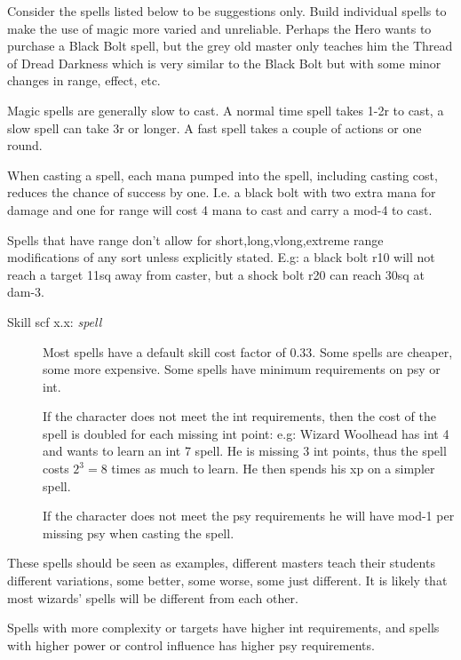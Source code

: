 Consider the spells listed below to be suggestions only. Build individual spells to make the use of magic more varied and unreliable. Perhaps the Hero wants to purchase a Black Bolt spell, but the grey old master only teaches him the Thread of Dread Darkness which is very similar to the Black Bolt but with some minor changes in range, effect, etc.

Magic spells are generally slow to cast. A normal time spell takes 1-2r to cast, a slow spell can take 3r or longer. A fast spell takes a couple of actions or one round.

When casting a spell, each mana pumped into the spell, including casting cost, reduces the chance of success by one. I.e. a black bolt with two extra mana for damage and one for range will cost 4 mana to cast and carry a mod-4 to cast.

Spells that have range don't allow for short,long,vlong,extreme range modifications of any sort unless explicitly stated. E.g: a black bolt r10 will not reach a target 11sq away from caster, but a shock bolt r20 can reach 30sq at dam-3.


\begin{description}

\item[Skill scf x.x: \emph{spell}] Most spells have a default skill cost factor of 0.33. Some spells are cheaper, some more expensive. Some spells have minimum requirements on psy or int. 

If the character does not meet the int requirements, then the cost of the spell is doubled for each missing int point: e.g: Wizard Woolhead has int 4 and wants to learn an int 7 spell. He is missing 3 int points, thus the spell costs $2^3=8$ times as much to learn. He then spends his xp on a simpler spell.

If the character does not meet the psy requirements he will have mod-1 per missing psy when casting the spell.

\end{description}

These spells should be seen as examples, different masters teach their students different variations, some better, some worse, some just different. It is likely that most wizards' spells will be different from each other.

Spells with more complexity or targets have higher int requirements, and spells with higher power or control influence has higher psy requirements.








